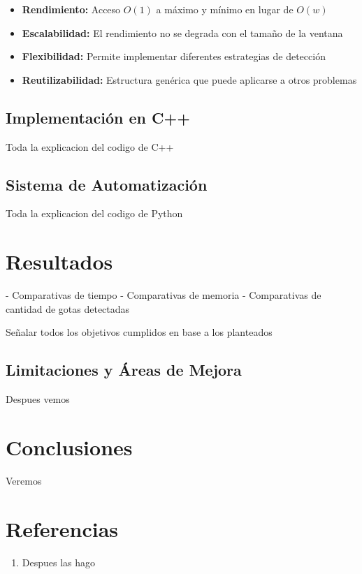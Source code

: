 \documentclass[12pt,a4paper]{article}
\begin{document}
\begin{itemize}
    \item \textbf{Rendimiento:} Acceso $O(1)$ a máximo y mínimo en lugar de $O(w)$
    \item \textbf{Escalabilidad:} El rendimiento no se degrada con el tamaño de la ventana
    \item \textbf{Flexibilidad:} Permite implementar diferentes estrategias de detección
    \item \textbf{Reutilizabilidad:} Estructura genérica que puede aplicarse a otros problemas
\end{itemize}

\subsection{Implementación en C++}
\lhead{}

Toda la explicacion del codigo de C++

\subsection{Sistema de Automatización}
\lhead{}

Toda la explicacion del codigo de Python

\section{Resultados}

- Comparativas de tiempo
- Comparativas de memoria
- Comparativas de cantidad de gotas detectadas

Señalar todos los objetivos cumplidos en base a los planteados

\subsection{Limitaciones y Áreas de Mejora}
\lhead{}

Despues vemos

\section{Conclusiones}

Veremos 

\section{Referencias}

\begin{enumerate}
    \item Despues las hago
\end{enumerate}
\end{document}
